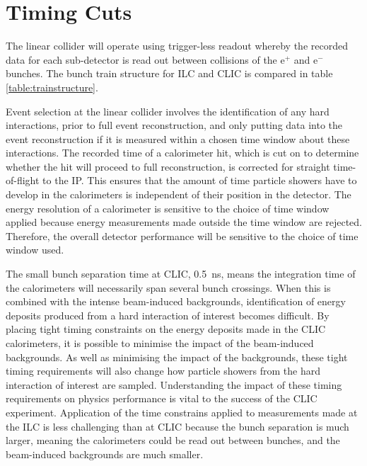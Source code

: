 
\section{Timing Cuts}
The linear collider will operate using trigger-less readout whereby the recorded data for each sub-detector is read out between collisions of the $\text{e}^{+}$ and $\text{e}^{-}$ bunches.  The bunch train structure for ILC and CLIC is compared in table \ref{table:trainstructure}.  

{Event selection at the linear collider} involves the identification of any hard interactions, prior to full event reconstruction, and only putting data into the event reconstruction if it is measured within a chosen time window about these interactions.  The recorded time of a calorimeter hit, which is cut on to {determine whether the hit will proceed to full reconstruction,} is corrected for straight time-of-flight to the IP.  This ensures that the amount of time particle showers have to develop in the calorimeters is independent of their position in the detector.  The energy resolution of a calorimeter is sensitive to the choice of time window applied because energy measurements made outside the time window are rejected.  Therefore, the overall detector performance will be sensitive to the choice of time window used.  

{The small bunch separation time at CLIC, 0.5~ns, means} the integration time of the calorimeters will {necessarily} span {several} bunch crossings.  When this is combined with the intense beam-induced backgrounds, identification of energy deposits produced from a hard interaction of interest becomes difficult.  By placing tight timing constraints on the energy deposits made in the CLIC calorimeters, it is possible to minimise the impact of the beam-induced backgrounds.  As well as minimising the impact of the backgrounds, these tight timing requirements will also change how particle showers from the hard interaction of interest are sampled.  Understanding the impact of these timing requirements on physics performance is vital to the success of the CLIC experiment.  Application of {the time constrains applied to measurements made} at the ILC is less challenging than at CLIC because the bunch separation is much larger, meaning the calorimeters could be read out between bunches, and the beam-induced backgrounds are much smaller.  

